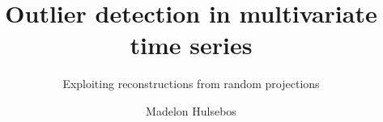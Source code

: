 \documentclass[whitelogo]{tudelft-report}
\begin{document}
\frontmatter

\title[tudelft-white]{Outlier detection in multivariate time series}
\subtitle[tudelft-white]{Exploiting reconstructions from random projections}
\author[tudelft-white]{Madelon Hulsebos}

\makecover[split]



\tableofcontents



\mainmatter












\appendix


\end{document}
